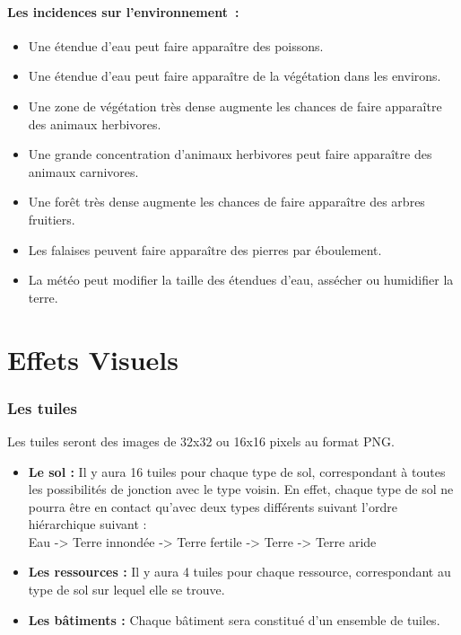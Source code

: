 \documentclass[a4paper]{article}
\newcommand{\alinea}{\hspace*{0.5cm}}
\begin{document}
      \subsection{Les incidences sur l'environnement :}
        \begin{itemize} \small
          \item Une étendue d'eau peut faire apparaître des poissons.
          \item Une étendue d'eau peut faire apparaître de la végétation dans les environs.
          \item Une zone de végétation très dense augmente les chances de faire apparaître des animaux herbivores.
          \item Une grande concentration d'animaux herbivores peut faire apparaître des animaux carnivores.
          \item Une forêt très dense augmente les chances de faire apparaître des arbres fruitiers.
          \item Les falaises peuvent faire apparaître des pierres par éboulement.
          \item La météo peut modifier la taille des étendues d'eau, assécher ou humidifier la terre.
        \end{itemize} \normalsize


  \newpage
  \part{Effets Visuels}


    \section{Les tuiles}
      \label{Tuile}
      \alinea Les tuiles seront des images de 32x32 ou 16x16 pixels au format PNG.\\
      \begin{itemize} \small
        \item \textbf{Le sol :} Il y aura 16 tuiles pour chaque type de sol, correspondant à toutes les possibilités de jonction avec le type voisin. En effet, chaque type de sol ne pourra être en contact qu'avec deux types différents suivant l'ordre hiérarchique suivant :\\
          Eau -> Terre innondée -> Terre fertile -> Terre -> Terre aride
        \item \textbf{Les ressources :} Il y aura 4 tuiles pour chaque ressource, correspondant au type de sol sur lequel elle se trouve.
        \item \textbf{Les bâtiments :} Chaque bâtiment sera constitué d'un ensemble de tuiles.
      \end{itemize} \normalsize
  
\end{document}

